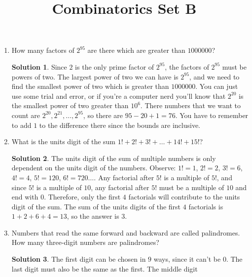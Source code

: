 \documentclass{article}
\title{Combinatorics Set B}
\author{}
\date{}
\theoremstyle{definition}
\newtheorem*{solution}{Solution}
\begin{document}
\maketitle

\begin{multicols}{2}
    \begin{enumerate}
        \item How many factors of $2^{95}$ are there which are greater than 
            $\num{1000000}$?
            \begin{solution}
                Since $2$ is the only prime factor of $2^{95}$, the factors of 
                $2^{95}$ must be powers of two. The largest power of two we can have 
                is $2^{95}$, and we need to find the smallest power of two which is 
                greater than $\num{1000000}$. You can just use some trial and error, 
                or if you're a computer nerd you'll know that $2^{20}$ is the 
                smallest power of two greater than $10^6$. There numbers that we 
                want to count are $2^{20}, 2^{21}, \dots, 2^{95}$, so there are $95 
                - 20 + 1 = 76$. You have to remember to add $1$ to the difference 
                there since the bounds are inclusive.
            \end{solution}
        \item What is the units digit of the sum $1! + 2! + 3! + \dots + 14! + 15!$?
            \begin{solution}
                The units digit of the sum of multiple numbers is only dependent on 
                the units digit of the numbers. Observe: $1! = 1$, $2! = 2$, $3! = 
                6$, $4! = 4$, $5! = 120$, $6! = 720 \dots$. Any factorial after $5!$ 
                is a multiple of $5!$, and since $5!$ is a multiple of $10$, any 
                factorial after $5!$ must be a multiple of $10$ and end with $0$. 
                Therefore, only the first $4$ factorials will contribute to the 
                units digit of the sum. The sum of the units digits of the first $4$ 
                factorials is $1 + 2 + 6 + 4 = 13$, so the answer is $3$.
            \end{solution}
        \item Numbers that read the same forward and backward are called 
            palindromes. How many three-digit numbers are palindromes?
            \begin{solution}
                The first digit can be chosen in $9$ ways, since it can't be $0$. 
                The last digit must also be the same as the first. The middle digit 

\end{solution}
\end{enumerate}
\end{multicols}
\end{document}
